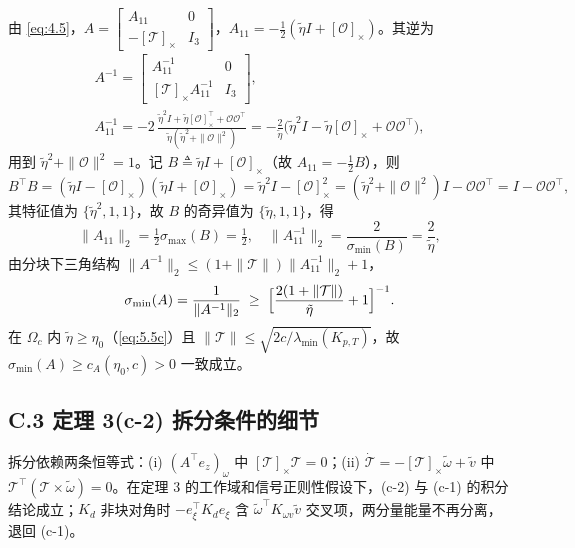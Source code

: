 由 \eqref{eq:4.5}，$A=\begin{bmatrix}A_{11}&0\\ -[\mathcal T]_\times& I_3\end{bmatrix}$，$A_{11}=-\tfrac12(\tilde\eta I+[\mathcal O]_\times)$。其逆为
\begin{equation*}
\begin{gathered}
A^{-1}=\begin{bmatrix}A_{11}^{-1}&0\\ [\mathcal T]_\times A_{11}^{-1}& I_3\end{bmatrix},\\[2pt]
A_{11}^{-1}=-2\,\frac{\tilde\eta^2I+\tilde\eta[\mathcal O]_\times^{\top}+\mathcal O\mathcal O^\top}{\tilde\eta(\tilde\eta^2+\|\mathcal O\|^2)}
=-\frac2{\tilde\eta}\bigl(\tilde\eta^2I-\tilde\eta[\mathcal O]_\times+\mathcal O\mathcal O^\top\bigr),
\end{gathered}
\end{equation*}
用到 $\tilde\eta^2+\|\mathcal O\|^2=1$。记 $B\triangleq\tilde\eta I+[\mathcal O]_\times$（故 $A_{11}=-\tfrac12B$），则
\begin{equation*}
B^\top B=(\tilde\eta I-[\mathcal O]_\times)(\tilde\eta I+[\mathcal O]_\times)=\tilde\eta^2I-[\mathcal O]_\times^2=(\tilde\eta^2+\|\mathcal O\|^2)I-\mathcal O\mathcal O^\top=I-\mathcal O\mathcal O^\top ,
\end{equation*}
其特征值为 $\{\tilde\eta^2,1,1\}$，故 $B$ 的奇异值为 $\{\tilde\eta,1,1\}$，得
\begin{equation*}
\|A_{11}\|_2=\tfrac12\sigma_{\max}(B)=\tfrac12 ,
\quad
\|A_{11}^{-1}\|_2=\frac2{\sigma_{\min}(B)}=\frac2{\tilde\eta} ,
\end{equation*}
由分块下三角结构 $\|A^{-1}\|_2\le(1+\|\mathcal T\|)\allowbreak\|A_{11}^{-1}\|_2+1$，
\begin{equation*}
\sigma_{\min}(A)=\frac1{\|A^{-1}\|_2}\;\ge\;\Bigl[\frac{2(1+\|\mathcal T\|)}{\tilde\eta}+1\Bigr]^{-1} .
\end{equation*}
在 $\Omega_c$ 内 $\tilde\eta\ge\eta_0$（\eqref{eq:5.5c}）且 $\|\mathcal T\|\le\sqrt{2c/\lambda_{\min}(K_{p,T})}$，故 $\sigma_{\min}(A)\ge c_A(\eta_0,c)>0$ 一致成立。

\subsection*{C.3 定理 3(c-2) 拆分条件的细节}

拆分依赖两条恒等式：(i) $(A^\top e_z)_\omega$ 中 $[\mathcal T]_\times\mathcal T=0$；(ii) $\dot{\mathcal T}=-[\mathcal T]_\times\tilde\omega+\tilde v$ 中 $\mathcal T^\top(\mathcal T\times\tilde\omega)=0$。在定理 3 的工作域和信号正则性假设下，(c-2) 与 (c-1) 的积分结论成立；$K_d$ 非块对角时 $-e_\xi^\top K_de_\xi$ 含 $\tilde\omega^\top K_{\omega v}\tilde v$ 交叉项，两分量能量不再分离，退回 (c-1)。

